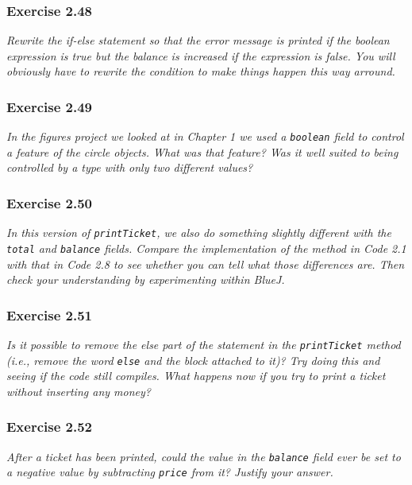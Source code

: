 \subsubsection*{Exercise 2.48}
\textit{Rewrite the if-else statement so that the error message is printed if 
the boolean expression is true but the balance is increased if the expression 
is false. You will obviously have to rewrite the condition to make things 
happen this way arround. }\\

\subsubsection*{Exercise 2.49}
\textit{In the figures project we looked at in Chapter 1 we used a 
\lstinline?boolean? field to control a feature of the circle objects. What was 
that feature? Was it well suited to being controlled by a type with only two 
different values? }\\

\subsubsection*{Exercise 2.50}
\textit{In this version of \lstinline{printTicket}, we also do something 
slightly different with the \lstinline{total} and \lstinline{balance} fields. 
Compare the implementation of the method in Code 2.1 with that in Code 2.8 to 
see whether you can tell what those differences are. Then check your 
understanding by experimenting within BlueJ. }\\

\subsubsection*{Exercise 2.51}
\textit{Is it possible to remove the else part of the statement in the 
\lstinline{printTicket} method (i.e., remove the word \lstinline{else} and the 
block attached to it)? Try doing this and seeing if the code still compiles. 
What happens now if you try to print a ticket without inserting any money? }\\

\subsubsection*{Exercise 2.52}
\textit{After a ticket has been printed, could the value in the 
\lstinline{balance} field ever be set to a negative value by subtracting 
\lstinline{price} from it? Justify your answer. }\\

